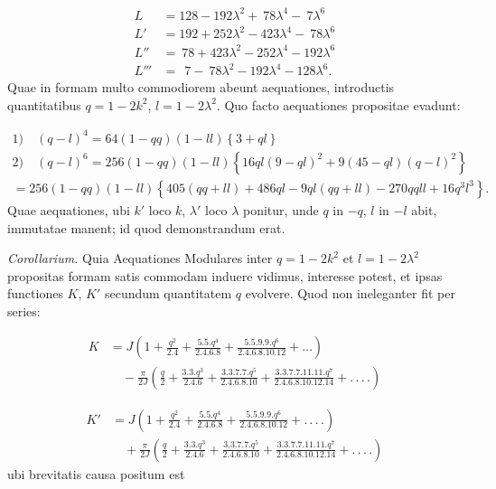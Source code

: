 \documentclass{article}
\begin{document}
\[
\begin{aligned}
L&=128-192\lambda^{2}+\ 78\lambda^{4}-\ 7\lambda^{6}\\
L'&=192+252\lambda^{2}-423\lambda^{4}-\ 78\lambda^{6}\\
L''&=\ 78+423\lambda^{2}-252\lambda^{4}-192\lambda^{6}\\
L'''&=\ \ 7-\ 78\lambda^{2}-192\lambda^{4}-128\lambda^{6}.
\end{aligned}
\]
Quae in formam multo commodiorem abeunt aequationes, introductis quantitatibus $q=1-2k^{2}$, $l=1-2\lambda^{2}$. Quo facto aequationes propositae evadunt:

\[
\begin{gathered}
\text{1)}\quad(q-l)^{4}=64(1-qq)(1-ll)\left\{3+ql\right\}\\[1ex]
\text{2)}\quad(q-l)^{6}=256(1-qq)(1-ll)\left\{16ql(9-ql)^{2}+9(45-ql)(q-l)^{2}\right\}\\
=256(1-qq)(1-ll)\left\{405(qq+ll)+486ql-9ql(qq+ll)-270qqll+16q^{3}l^{3}\right\}.
\end{gathered}
\]
Quae aequationes, ubi $k'$ loco $k$, $\lambda'$ loco $\lambda$ ponitur, unde $q$ in $-q$, $l$ in $-l$ abit, immutatae manent; id quod demonstrandum erat.

\emph{Corollarium.} Quia Aequationes Modulares inter $q=1-2k^{2}$ et $l=1-2\lambda^{2}$ propositas formam satis commodam induere vidimus, interesse potest, et ipsas functiones $K$, $K'$ secundum quantitatem $q$ evolvere. Quod non ineleganter fit per series:

\[
\begin{aligned}
K&=J\left(1+\frac{q^{2}}{2.4}+\frac{5.5.q^{4}}{2.4.6.8}+\frac{5.5.9.9.q^{6}}{2.4.6.8.10.12}+\ldots\right)\\
&\quad-\frac{\pi}{2J}\left(\frac{q}{2}+\frac{3.3.q^{3}}{2.4.6}+\frac{3.3.7.7.q^{5}}{2.4.6.8.10}+\frac{3.3.7.7.11.11.q^{7}}{2.4.6.8.10.12.14}+.\,.\,.\,.\right)
\end{aligned}
\]

\[
\begin{aligned}
K'&=J\left(1+\frac{q^{2}}{2.4}+\frac{5.5.q^{4}}{2.4.6.8}+\frac{5.5.9.9.q^{6}}{2.4.6.8.10.12}+.\,.\,.\,.\right)\\
&\quad+\frac{\pi}{2J}\left(\frac{q}{2}+\frac{3.3.q^{3}}{2.4.6}+\frac{3.3.7.7.q^{5}}{2.4.6.8.10}+\frac{3.3.7.7.11.11.q^{7}}{2.4.6.8.10.12.14}+.\,.\,.\,.\right)
\end{aligned}
\]
ubi brevitatis causa positum est
\end{document}
